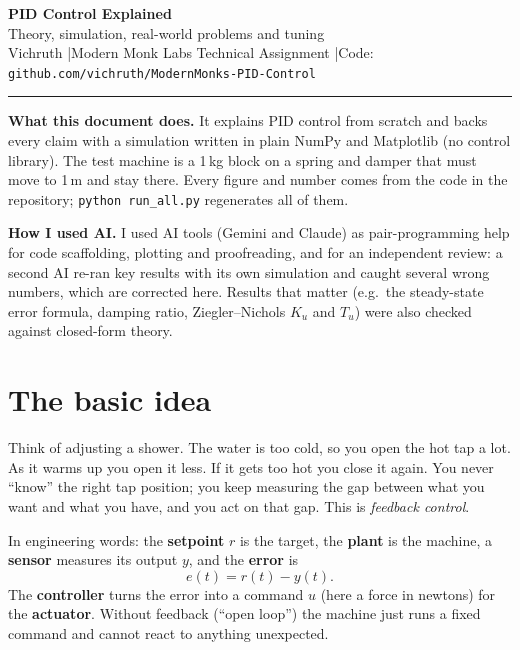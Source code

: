 \documentclass[10pt,a4paper]{article}
\begin{document}
\begin{center}
{\LARGE\bfseries PID Control Explained}\\[3pt]
{\large Theory, simulation, real-world problems and tuning}\\[4pt]
Vichruth \quad|\quad Modern Monk Labs Technical Assignment \quad|\quad Code: \texttt{github.com/vichruth/ModernMonks-PID-Control}
\end{center}
\vspace{-4pt}\hrule\vspace{5pt}

\noindent\textbf{What this document does.} It explains PID control from scratch and backs every claim with a simulation written in plain NumPy and Matplotlib (no control library). The test machine is a 1\,kg block on a spring and damper that must move to 1\,m and stay there. Every figure and number comes from the code in the repository; \texttt{python run\_all.py} regenerates all of them.

\noindent\textbf{How I used AI.} I used AI tools (Gemini and Claude) as pair-programming help for code scaffolding, plotting and proofreading, and for an independent review: a second AI re-ran key results with its own simulation and caught several wrong numbers, which are corrected here. Results that matter (e.g.\ the steady-state error formula, damping ratio, Ziegler--Nichols $K_u$ and $T_u$) were also checked against closed-form theory.

\section{The basic idea}
Think of adjusting a shower. The water is too cold, so you open the hot tap a lot. As it warms up you open it less. If it gets too hot you close it again. You never ``know'' the right tap position; you keep measuring the gap between what you want and what you have, and you act on that gap. This is \emph{feedback control}.

In engineering words: the \textbf{setpoint} $r$ is the target, the \textbf{plant} is the machine, a \textbf{sensor} measures its output $y$, and the \textbf{error} is
\begin{equation}e(t)=r(t)-y(t).\end{equation}
The \textbf{controller} turns the error into a command $u$ (here a force in newtons) for the \textbf{actuator}. Without feedback (``open loop'') the machine just runs a fixed command and cannot react to anything unexpected.
\end{document}
